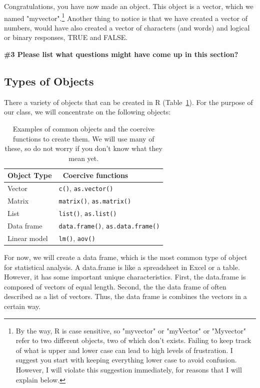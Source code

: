 \documentclass{tufte-handout}\usepackage[]{graphicx}\usepackage[]{color}
\begin{document}
Congratulations, you have now made an object. This object is a vector, which we  named "myvector".\footnote{By the way, R is case sensitive, so "myvector" or "myVector" or "Myvector" refer to two different objects, two of which don't exists. Failing to keep track of what is upper and lower case can lead to high levels of frustration. I suggest you start with keeping everything lower case to avoid confusion. However, I will violate this suggestion immediately, for reasons that I will explain below.} Another thing to notice is that we have created a vector of numbers, would have also created a vector of characters (and words) and logical or binary responses, \ie TRUE and FALSE.

\bigskip
\noindent \textbf{\#3 Please list what questions might have come up in this section? }

\subsection{Types of Objects}

There a variety of objects that can be created in R (Table~\ref{tab:CommonObjects}). For the purpose of our class, we will concentrate on the following objects:
\begin{table}
	\centering
		\begin{tabular}{ll}
Object Type &\ Coercive functions \\
\hline
Vector & \texttt{c()}, \texttt{as.vector()} \\
Matrix & \texttt{matrix()}, \texttt{as.matrix()} \\
List & \texttt{list()}, \texttt{as.list()} \\
Data frame & \texttt{data.frame()}, \texttt{as.data.frame()} \\
Linear model & \texttt{lm()}, \texttt{aov()} \\\hline
		\end{tabular}
	\caption{Examples of common objects and the coercive functions to create them. We will use many of these, so do not worry if you don't know what they mean yet.}
	\label{tab:CommonObjects}
\end{table}

For now, we will create a data frame, which is the most common type of object for statistical analysis. A data.frame is like a spreadsheet in Excel or a table. However, it has some important unique characteristics. First, the data.frame is composed of vectors of equal length. Second, the the data frame of often described as a list of vectors. Thus, the data frame is combines the vectors in a certain way. 
\end{document}
